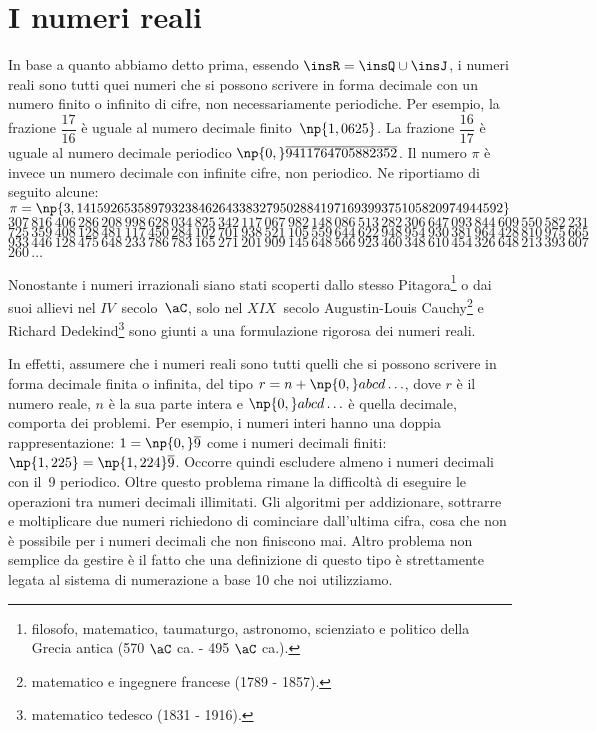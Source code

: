 \section{I numeri reali}

In base a quanto abbiamo detto prima, essendo $\insR=\insQ \cup \insJ$, i numeri reali sono tutti quei numeri che si possono scrivere in forma decimale con un numero finito o infinito di cifre, non necessariamente periodiche.
Per esempio, la frazione $\dfrac{17}{16}$ è uguale al numero decimale finito~$\np{1,0625}$.
La frazione $\dfrac{16}{17}$ è uguale al numero decimale periodico $\np{0,}\overline{9411764705882352}$.
Il numero $\pi$ è invece un numero decimale con infinite cifre, non periodico. Ne riportiamo di seguito alcune:
$\pi=\np{3,141592653589793238462643383279502884197169399375105820974944592}$
$307\,816\,406\,286\,208\,998\,628\,034\,825\,342\,117\,067\,982\,148\,086\,513\,282\,306\,647\,093\,844\,609\,550\,582\,231$
$725\,359\,408\,128\,481\,117\,450\,284\,102\,701\,938\,521\,105\,559\,644\,622\,948\,954\,930\,381\,964\,428\,810\,975\,665$
$933\,446\,128\,475\,648\,233\,786\,783\,165\,271\,201\,909\,145\,648\,566\,923\,460\,348\,610\,454\,326\,648\,213\,393\,607$
$260\,\ldots$

Nonostante i numeri irrazionali siano stati scoperti dallo stesso Pitagora\footnote{filosofo, matematico, taumaturgo, astronomo, scienziato e politico della Grecia antica (570 $\aC$ ca. - 495 $\aC$ ca.).} o dai suoi allievi nel $IV$~secolo~$\aC$, solo nel $XIX$~secolo Augustin-Louis Cauchy\footnote{matematico e ingegnere francese (1789 - 1857).} e Richard Dedekind\footnote{matematico tedesco (1831 - 1916).} sono giunti a una formulazione rigorosa dei numeri reali.

In effetti, assumere che i numeri reali sono tutti quelli che si possono scrivere in forma decimale finita o infinita, del tipo $r=n+\np{0,}abcd\ldots$, dove $r$ è il numero reale, $n$ è la sua parte intera e $\np{0,}abcd\ldots$ è quella decimale, comporta dei problemi. Per esempio, i numeri interi hanno una doppia rappresentazione: $1=\np{0,}\overline{9}$ come i numeri decimali finiti: $\np{1,225}=\np{1,224}\overline{9}$. Occorre quindi escludere almeno i numeri decimali con il~9 periodico. Oltre questo problema rimane la difficoltà di eseguire le operazioni tra numeri decimali illimitati. Gli algoritmi per addizionare, sottrarre e moltiplicare due numeri richiedono di cominciare dall'ultima cifra, cosa che non è possibile per i numeri decimali che non finiscono mai. Altro problema non semplice da gestire è il fatto che una definizione di
questo tipo è strettamente legata al sistema di numerazione a base 10 che noi utilizziamo.

